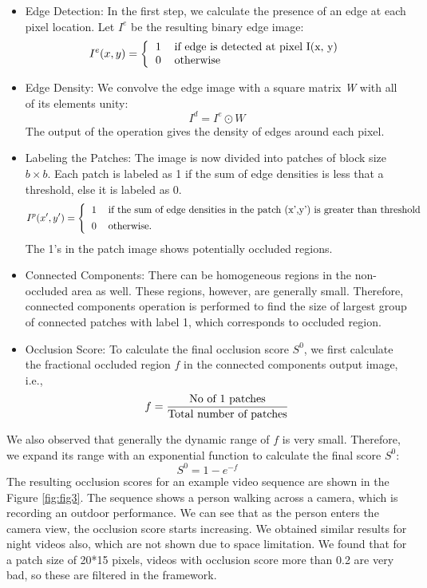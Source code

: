 \documentclass{sig-alternate}
\begin{document}
 \begin{itemize} 
    \item Edge Detection: In the first step, we calculate the presence of an edge at each pixel location. Let $I^{e}$ be the resulting binary edge image:
    \begin{equation}
        I^{e}(x,y)=\bigg\{\begin{tabular}{cl}1 & if edge is detected at pixel I(x, y)\\0 & otherwise\end{tabular}
    \end{equation}
    \item Edge Density: We convolve the edge image with a square matrix \textit{W} with all of its elements unity:
    \begin{equation}
        I^d=I^e\odot W
    \end{equation}
    The output of the operation gives the density of edges around each pixel.
    \item Labeling the Patches: The image is now divided into patches of block size $b \times b$. Each patch is labeled as 1 if the sum of edge densities is less that a threshold, else it is labeled as 0.
    \begin{equation}
        I^p(x',y')=\Bigg\{\begin{tabular}{cl}1 & if the sum of edge densities in the patch (x',y') is greater than threshold \\ [1ex] 0 & otherwise. \end{tabular}
    \end{equation}
    The 1’s in the patch image shows potentially occluded regions.
    \item Connected Components: There can be homogeneous regions in the non-occluded area as well. These regions, however, are generally small. Therefore, connected components operation is performed to find the size of largest group of connected patches with label 1, which corresponds to occluded region.
    \item Occlusion Score: To calculate the final occlusion score $S^0$, we first calculate the fractional occluded region $f$ in the connected components output image, i.e.,
    \begin{equation}
        f=\frac{\textnormal{No of 1 patches}}{\textnormal{Total number of patches}}
    \end{equation}
 \end{itemize} 
We also observed that generally the dynamic range of $f$ is very small. Therefore, we expand its range with an exponential function to calculate the final score $S^0$:
\begin{equation}
    S^0=1-e^{-f}
\end{equation}
The resulting occlusion scores for an example video sequence are shown in the Figure \ref{fig:fig3}. The sequence shows a person walking across a camera, which is recording an outdoor performance. We can see that as the person enters the camera view, the occlusion score starts increasing. We obtained similar results for night videos also, which are not shown due to space limitation. We found that for a patch size of 20*15 pixels, videos with occlusion score more than 0.2 are very bad, so these are filtered in the framework.
\end{document}
